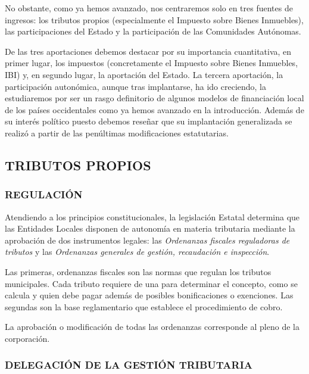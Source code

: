 \documentclass[
]{article}
\begin{document}
No obstante, como ya hemos avanzado, nos centraremos solo en tres
fuentes de ingresos: los tributos propios (especialmente el Impuesto
sobre Bienes Inmuebles), las participaciones del Estado y la
participación de las Comunidades Autónomas.

De las tres aportaciones debemos destacar por su importancia
cuantitativa, en primer lugar, los impuestos (concretamente el Impuesto
sobre Bienes Inmuebles, IBI) y, en segundo lugar, la aportación del
Estado. La tercera aportación, la participación autonómica, aunque tras
implantarse, ha ido creciendo, la estudiaremos por ser un rasgo
definitorio de algunos modelos de financiación local de los países
occidentales como ya hemos avanzado en la introducción. Además de su
interés político puesto debemos reseñar que su implantación generalizada
se realizó a partir de las penúltimas modificaciones estatutarias.

\hypertarget{tributos-propios}{%
\subsection{TRIBUTOS PROPIOS}\label{tributos-propios}}

\hypertarget{regulaciuxf3n}{%
\subsubsection{REGULACIÓN}\label{regulaciuxf3n}}

Atendiendo a los principios constitucionales, la legislación Estatal
determina que las Entidades Locales disponen de autonomía en materia
tributaria mediante la aprobación de dos instrumentos legales: las
\emph{Ordenanzas fiscales reguladoras de tributos} y las
\emph{Ordenanzas generales de gestión, recaudación e inspección}.

Las primeras, ordenanzas fiscales son las normas que regulan los
tributos municipales. Cada tributo requiere de una para determinar el
concepto, como se calcula y quien debe pagar además de posibles
bonificaciones o exenciones. Las segundas son la base reglamentario que
establece el procedimiento de cobro.

La aprobación o modificación de todas las ordenanzas corresponde al
pleno de la corporación.

\hypertarget{delegaciuxf3n-de-la-gestiuxf3n-tributaria}{%
\subsubsection{DELEGACIÓN DE LA GESTIÓN
TRIBUTARIA}\label{delegaciuxf3n-de-la-gestiuxf3n-tributaria}}
\end{document}
